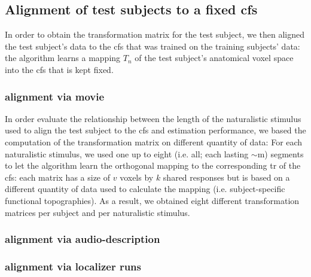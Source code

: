 \subsection{Alignment of test subjects to a fixed \ac{cfs}}



%
In order to obtain the transformation matrix for the test subject, we then
aligned the test subject's data to the \ac{cfs} that was trained on the training
subjects' data:
%
the algorithm learns a mapping $T_{n}$ of the test subject's anatomical voxel
space into the \ac{cfs} that is kept fixed.


\subsubsection{alignment via movie}
%
In order evaluate the relationship between the length of the naturalistic
stimulus used to align the test subject to the \ac{cfs} and estimation
performance, we based the computation of the transformation matrix on different
quantity of data:
%
For each naturalistic stimulus, we used one up to eight (i.e. all; each lasting
$\sim$\unit[15]{m}) segments to let the algorithm learn the orthogonal mapping
to the corresponding \acs{tr} of the \ac{cfs}:
%
each matrix has a size of $v$ voxels by $k$ shared responses but is based on a
different quantity of data used to calculate the mapping (i.e. subject-specific
functional topographies).
%
As a result, we obtained eight different transformation matrices per subject and
per naturalistic stimulus.


\subsubsection{alignment via audio-description}


\subsubsection{alignment via localizer runs}


